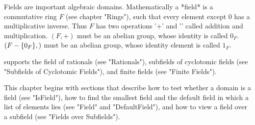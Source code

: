 
Fields  are important algebraic  domains.  Mathematically a *field*  is a
commutative  ring  $F$  (see  chapter  "Rings"), such that  every element
except $0$ has a multiplicative inverse.  Thus $F$ has two operations '+'
and '\*' called addition  and multiplication.  $(F,+)$ must be an abelian
group,  whose identity  is called  $0_F$.   $(F-\{0_F\},\*)$  must  be an
abelian group, whose identity element is called $1_F$.

{\GAP} supports  the field  of rationals (see "Rationals"),  subfields of
cyclotomic  fields  (see  "Subfields of Cyclotomic Fields"),  and  finite
fields (see "Finite Fields").

This chapter begins with sections  that describe how  to  test whether  a
domain is a field (see "IsField"), how to find the smallest field and the
default  field  in  which  a  list  of  elements lies  (see  "Field"  and
"DefaultField"),  and how  to view a field  over  a subfield (see "Fields
over Subfields").

